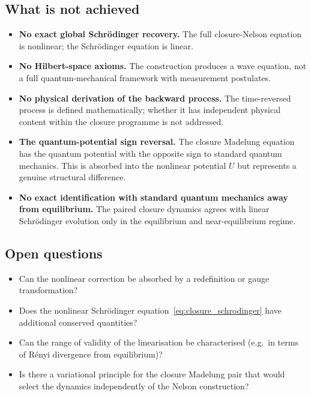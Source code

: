 \documentclass[12pt]{article}
\begin{document}
\subsection{What is not achieved}

\begin{itemize}
    \item \textbf{No exact global Schr\"odinger recovery.} The full closure-Nelson equation is nonlinear; the Schr\"odinger equation is linear.
    \item \textbf{No Hilbert-space axioms.} The construction produces a wave equation, not a full quantum-mechanical framework with measurement postulates.
    \item \textbf{No physical derivation of the backward process.} The time-reversed process is defined mathematically; whether it has independent physical content within the closure programme is not addressed.
    \item \textbf{The quantum-potential sign reversal.} The closure Madelung equation has the quantum potential with the opposite sign to standard quantum mechanics. This is absorbed into the nonlinear potential $U$ but represents a genuine structural difference.
    \item \textbf{No exact identification with standard quantum mechanics away from equilibrium.} The paired closure dynamics agrees with linear Schr\"odinger evolution only in the equilibrium and near-equilibrium regime.
\end{itemize}

\subsection{Open questions}

\begin{itemize}
    \item Can the nonlinear correction be absorbed by a redefinition or gauge transformation?
    \item Does the nonlinear Schr\"odinger equation~\eqref{eq:closure_schrodinger} have additional conserved quantities?
    \item Can the range of validity of the linearisation be characterised (e.g.\ in terms of R\'enyi divergence from equilibrium)?
    \item Is there a variational principle for the closure Madelung pair that would select the dynamics independently of the Nelson construction?
\end{itemize}
\end{document}
